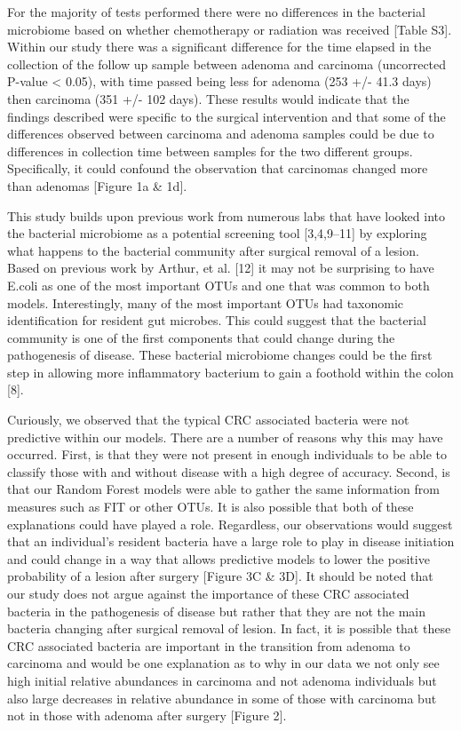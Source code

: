 \documentclass[12pt,]{article}
\begin{document}
For the majority of tests performed there were no differences in the
bacterial microbiome based on whether chemotherapy or radiation was
received {[}Table S3{]}. Within our study there was a significant
difference for the time elapsed in the collection of the follow up
sample between adenoma and carcinoma (uncorrected P-value \textless{}
0.05), with time passed being less for adenoma (253 +/- 41.3 days) then
carcinoma (351 +/- 102 days). These results would indicate that the
findings described were specific to the surgical intervention and that
some of the differences observed between carcinoma and adenoma samples
could be due to differences in collection time between samples for the
two different groups. Specifically, it could confound the observation
that carcinomas changed more than adenomas {[}Figure 1a \& 1d{]}.

This study builds upon previous work from numerous labs that have looked
into the bacterial microbiome as a potential screening tool
{[}3,4,9--11{]} by exploring what happens to the bacterial community
after surgical removal of a lesion. Based on previous work by Arthur, et
al. {[}12{]} it may not be surprising to have E.coli as one of the most
important OTUs and one that was common to both models. Interestingly,
many of the most important OTUs had taxonomic identification for
resident gut microbes. This could suggest that the bacterial community
is one of the first components that could change during the pathogenesis
of disease. These bacterial microbiome changes could be the first step
in allowing more inflammatory bacterium to gain a foothold within the
colon {[}8{]}.

Curiously, we observed that the typical CRC associated bacteria were not
predictive within our models. There are a number of reasons why this may
have occurred. First, is that they were not present in enough
individuals to be able to classify those with and without disease with a
high degree of accuracy. Second, is that our Random Forest models were
able to gather the same information from measures such as FIT or other
OTUs. It is also possible that both of these explanations could have
played a role. Regardless, our observations would suggest that an
individual's resident bacteria have a large role to play in disease
initiation and could change in a way that allows predictive models to
lower the positive probability of a lesion after surgery {[}Figure 3C \&
3D{]}. It should be noted that our study does not argue against the
importance of these CRC associated bacteria in the pathogenesis of
disease but rather that they are not the main bacteria changing after
surgical removal of lesion. In fact, it is possible that these CRC
associated bacteria are important in the transition from adenoma to
carcinoma and would be one explanation as to why in our data we not only
see high initial relative abundances in carcinoma and not adenoma
individuals but also large decreases in relative abundance in some of
those with carcinoma but not in those with adenoma after surgery
{[}Figure 2{]}.
\end{document}
